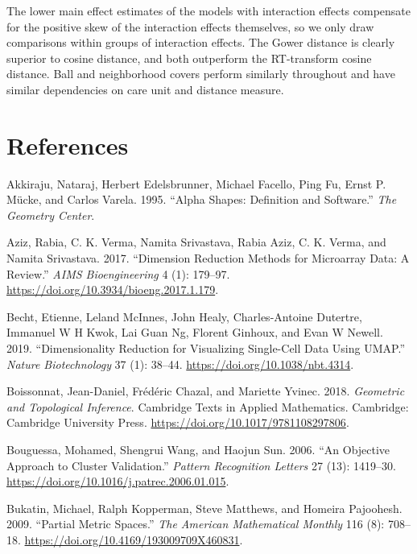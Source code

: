 \documentclass{article}
\newlength{\cslhangindent}
\newlength{\cslentryspacingunit} %
\newenvironment{CSLReferences}[2] %
 {%
  \setlength{\parindent}{0pt}
  \ifodd #1
  \let\oldpar\par
  \def\par{\hangindent=\cslhangindent\oldpar}
  \fi
  \setlength{\parskip}{#2\cslentryspacingunit}
 }%
 {}
\begin{document}
The lower main effect estimates of the models with interaction effects
compensate for the positive skew of the interaction effects themselves,
so we only draw comparisons within groups of interaction effects. The
Gower distance is clearly superior to cosine distance, and both
outperform the RT-transform cosine distance. Ball and neighborhood
covers perform similarly throughout and have similar dependencies on
care unit and distance measure.

\hypertarget{references}{%
\section*{References}\label{references}}

\hypertarget{refs}{}
\begin{CSLReferences}{1}{0}
\leavevmode{}%
Akkiraju, Nataraj, Herbert Edelsbrunner, Michael Facello, Ping Fu, Ernst
P. Mücke, and Carlos Varela. 1995. {``Alpha Shapes: Definition and
Software.''} \emph{The Geometry Center}.

\leavevmode{}%
Aziz, Rabia, C. K. Verma, Namita Srivastava, Rabia Aziz, C. K. Verma,
and Namita Srivastava. 2017. {``Dimension Reduction Methods for
Microarray Data: A Review.''} \emph{AIMS Bioengineering} 4 (1): 179--97.
\url{https://doi.org/10.3934/bioeng.2017.1.179}.

\leavevmode{}%
Becht, Etienne, Leland McInnes, John Healy, Charles-Antoine Dutertre,
Immanuel W H Kwok, Lai Guan Ng, Florent Ginhoux, and Evan W Newell.
2019. {``Dimensionality Reduction for Visualizing Single-Cell Data Using
{UMAP}.''} \emph{Nature Biotechnology} 37 (1): 38--44.
\url{https://doi.org/10.1038/nbt.4314}.

\leavevmode{}%
Boissonnat, Jean-Daniel, Frédéric Chazal, and Mariette Yvinec. 2018.
\emph{Geometric and {Topological Inference}}. Cambridge {Texts} in
{Applied Mathematics}. {Cambridge}: {Cambridge University Press}.
\url{https://doi.org/10.1017/9781108297806}.

\leavevmode{}%
Bouguessa, Mohamed, Shengrui Wang, and Haojun Sun. 2006. {``An Objective
Approach to Cluster Validation.''} \emph{Pattern Recognition Letters} 27
(13): 1419--30. \url{https://doi.org/10.1016/j.patrec.2006.01.015}.

\leavevmode{}%
Bukatin, Michael, Ralph Kopperman, Steve Matthews, and Homeira
Pajoohesh. 2009. {``Partial {Metric Spaces}.''} \emph{The American
Mathematical Monthly} 116 (8): 708--18.
\url{https://doi.org/10.4169/193009709X460831}.


\end{CSLReferences}
\end{document}
